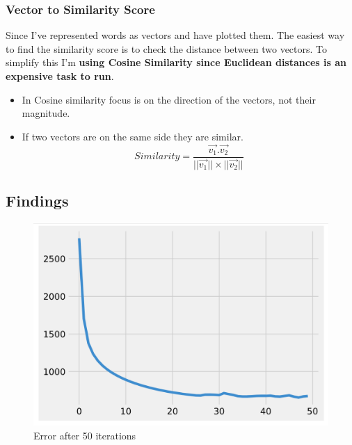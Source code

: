 \documentclass{article}
\begin{document}
\subsubsection{Vector to Similarity Score}
Since I've represented words as vectors and have plotted them. The easiest way to find the similarity score is to check the distance between two vectors. To simplify this I'm \textbf{using Cosine Similarity since Euclidean distances is an expensive task to run}. 
\begin{itemize}
    \item In Cosine similarity focus is on the direction of the vectors, not their magnitude.
    \item If two vectors are on the same side they are similar.
    $$
    Similarity = \frac{\vec{v_1}.\vec{v_2}}{||\vec{v_1}|| \times ||\vec{v_2}||}
    $$
\end{itemize}


\subsection{Findings}    

\begin{figure}[htbp]
    \begin{minipage}{0.5\textwidth}
        \centering
        \includegraphics[width=0.9\linewidth]{error after training.png}
        \caption{Error after 50 iterations}
        \label{fig:enter-label}
    \end{minipage}%
\end{figure}
\end{document}
